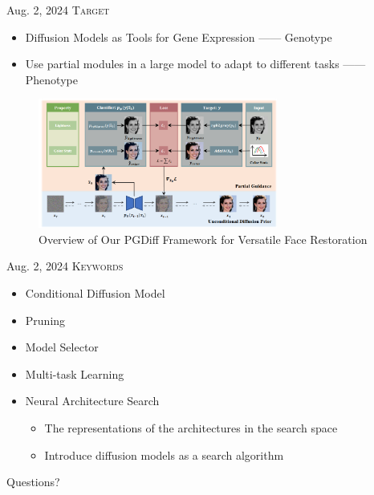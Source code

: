 \documentclass[10pt]{beamer}
\begin{document}
\begin{frame}{Aug. 2, 2024}
\textsc{Target}
    \begin{itemize}
        \item Diffusion Models as Tools for Gene Expression —— Genotype
        \item Use partial modules in a large model to adapt to different tasks —— Phenotype
    \end{itemize}
    \begin{figure}
            \centering
            \includegraphics[width=0.7\textwidth]{Fig/2024.8.02_1.png}
            \caption{Overview of Our PGDiff Framework for Versatile Face Restoration}
            \label{fig:my_label}
    \end{figure}
\end{frame}

\begin{frame}{Aug. 2, 2024}
\textsc{Keywords}
\begin{itemize}
    \item Conditional Diffusion Model
    \item Pruning
    \item Model Selector
    \item Multi-task Learning
    \item Neural Architecture Search
    \begin{itemize}
        \item The representations of the architectures in the search space
        \item Introduce diffusion models as a search algorithm
    \end{itemize}
\end{itemize}
\end{frame}

\begin{frame}[standout]
  Questions?
\end{frame}
\end{document}
